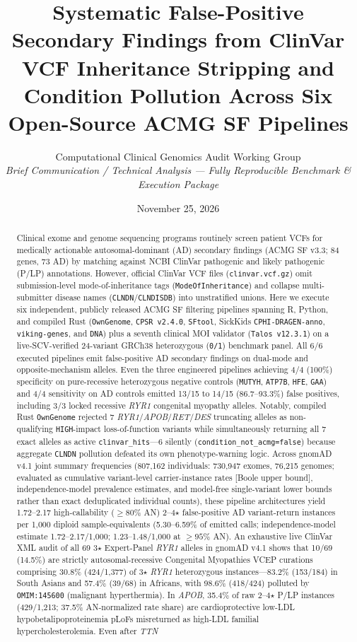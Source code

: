 \documentclass[11pt,letterpaper]{article}
\title{\textbf{Systematic False-Positive Secondary Findings from ClinVar VCF Inheritance Stripping and Condition Pollution Across Six Open-Source ACMG SF Pipelines}}
\author{
  Computational Clinical Genomics Audit Working Group\\
  \small\textit{Brief Communication / Technical Analysis --- Fully Reproducible Benchmark \& Execution Package}
}
\date{November 25, 2026}
\begin{document}
\maketitle

\begin{abstract}
\noindent
Clinical exome and genome sequencing programs routinely screen patient VCFs for medically actionable autosomal-dominant (AD) secondary findings (ACMG SF v3.3; 84 genes, 73 AD) by matching against NCBI ClinVar pathogenic and likely pathogenic (P/LP) annotations. However, official ClinVar VCF files (\texttt{clinvar.vcf.gz}) omit submission-level mode-of-inheritance tags (\texttt{ModeOfInheritance}) and collapse multi-submitter disease names (\texttt{CLNDN}/\texttt{CLNDISDB}) into unstratified unions. Here we execute six independent, publicly released ACMG SF filtering pipelines spanning R, Python, and compiled Rust (\texttt{OwnGenome}, \texttt{CPSR v2.4.0}, \texttt{SFtool}, SickKids \texttt{CPHI-DRAGEN-anno}, \texttt{viking-genes}, and \texttt{DNA}) plus a seventh clinical MOI validator (\texttt{Talos v12.3.1}) on a live-SCV-verified 24-variant GRCh38 heterozygous (\texttt{0/1}) benchmark panel. All 6/6 executed pipelines emit false-positive AD secondary findings on dual-mode and opposite-mechanism alleles. Even the three engineered pipelines achieving 4/4 (100\%) specificity on pure-recessive heterozygous negative controls (\texttt{MUTYH}, \texttt{ATP7B}, \texttt{HFE}, \texttt{GAA}) and 4/4 sensitivity on AD controls emitted 13/15 to 14/15 (86.7--93.3\%) false positives, including 3/3 locked recessive \textit{RYR1} congenital myopathy alleles. Notably, compiled Rust \texttt{OwnGenome} rejected 7 \textit{RYR1}/\textit{APOB}/\textit{RET}/\textit{DES} truncating alleles as non-qualifying \texttt{HIGH}-impact loss-of-function variants while simultaneously returning all 7 exact alleles as active \texttt{clinvar\_hits}---6 silently (\texttt{condition\_not\_acmg=false}) because aggregate \texttt{CLNDN} pollution defeated its own phenotype-warning logic. Across gnomAD v4.1 joint summary frequencies (807,162 individuals: 730,947 exomes, 76,215 genomes; evaluated as cumulative variant-level carrier-instance rates [Boole upper bound], independence-model prevalence estimates, and model-free single-variant lower bounds rather than exact deduplicated individual counts), these pipeline architectures yield 1.72--2.17 high-callability ($\ge 80\%$ AN) 2--4$\star$ false-positive AD variant-return instances per 1,000 diploid sample-equivalents (5.30--6.59\% of emitted calls; independence-model estimate 1.72--2.17/1,000; 1.23--1.48/1,000 at $\ge 95\%$ AN). An exhaustive live ClinVar XML audit of all 69 3$\star$ Expert-Panel \textit{RYR1} alleles in gnomAD v4.1 shows that 10/69 (14.5\%) are strictly autosomal-recessive Congenital Myopathies VCEP curations comprising 30.8\% (424/1,377) of 3$\star$ \textit{RYR1} heterozygous instances---83.2\% (153/184) in South Asians and 57.4\% (39/68) in Africans, with 98.6\% (418/424) polluted by \texttt{OMIM:145600} (malignant hyperthermia). In \textit{APOB}, 35.4\% of raw 2--4$\star$ P/LP instances (429/1,213; 37.5\% AN-normalized rate share) are cardioprotective low-LDL hypobetalipoproteinemia pLoFs misreturned as high-LDL familial hypercholesterolemia. Even after \textit{TTN} 
\end{abstract}
\end{document}
